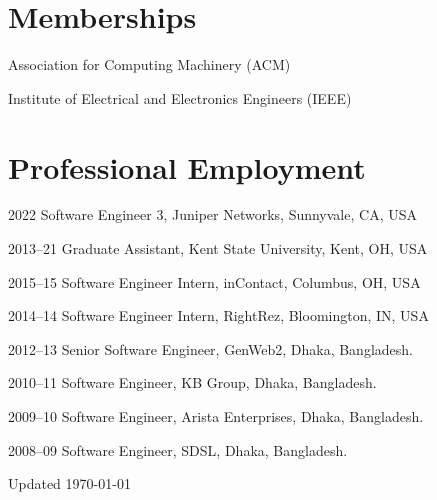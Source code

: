 \documentclass[11pt,letterpaper]{report}
\newcommand{\listitemspace}{0.25em}
\renewenvironment{itemize}
{\begin{list}{}{\setlength{\leftmargin}{0em}
                \setlength{\parskip}{0em}
                \setlength{\itemsep}{\listitemspace}
                \setlength{\parsep}{\listitemspace}}}
{\end{list}}
\begin{document}
    \section*{Memberships}

    \begin{itemize}

        \item Association for Computing Machinery (ACM)
        \item Institute of Electrical and Electronics Engineers (IEEE)

    \end{itemize}




    \section*{Professional Employment}

    \begin{tablist}

        \item[2022] \tab{}Software Engineer 3, Juniper Networks, Sunnyvale, CA, USA
        \item[2013--21] \tab{}Graduate Assistant, Kent State University, Kent, OH, USA
        \item[2015--15] \tab{}Software Engineer Intern, inContact, Columbus, OH, USA
        \item[2014--14] \tab{}Software Engineer Intern, RightRez, Bloomington, IN, USA
        \item[2012--13] \tab{}Senior Software Engineer, GenWeb2, Dhaka, Bangladesh.
        \item[2010--11] \tab{}Software Engineer, KB Group, Dhaka, Bangladesh.
        \item[2009--10] \tab{}Software Engineer, Arista Enterprises, Dhaka, Bangladesh.
        \item[2008--09] \tab{}Software Engineer, SDSL, Dhaka, Bangladesh.
                
    \end{tablist}



    \begin{center}
        \vfill
        Updated \monthyeardate\today
    \end{center}
\end{document}
